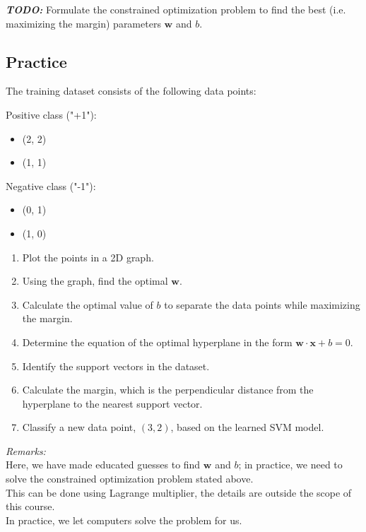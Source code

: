 \documentclass[]{article}
\begin{document}
	\noindent \textbf{\textit{TODO:}}
	Formulate the constrained optimization problem to find the best (i.e. maximizing the margin) parameters $\mathbf{w}$ and $b$.
	
	\subsection{Practice}
	The training dataset consists of the following data points:
	
	Positive class ("+1"):
	\begin{itemize}
		\item (2, 2)
		\item (1, 1)
	\end{itemize}
	Negative class ("-1"):
	\begin{itemize}
		\item (0, 1)
		\item (1, 0)
	\end{itemize}
	
	\begin{enumerate}
		\item Plot the points in a 2D graph.
		\item Using the graph, find the optimal $\mathbf{w}$.
		\item Calculate the optimal value of \(b\) to separate the data points while maximizing the margin.
		\item Determine the equation of the optimal hyperplane in the form \(\mathbf{w}\cdot\mathbf{x} + b = 0\).
		\item Identify the support vectors in the dataset.
		\item Calculate the margin, which is the perpendicular distance from the hyperplane to the nearest support vector.
		\item Classify a new data point, \((3, 2)\), based on the learned SVM model.
	\end{enumerate}
	\textit{Remarks:}\\
	Here, we have made educated guesses to find $\mathbf{w}$ and $b$; in practice, we need to solve the constrained optimization problem stated above.\\
	This can be done using Lagrange multiplier, the details are outside the scope of this course.\\
	In practice, we let computers solve the problem for us.
	
\end{document}
